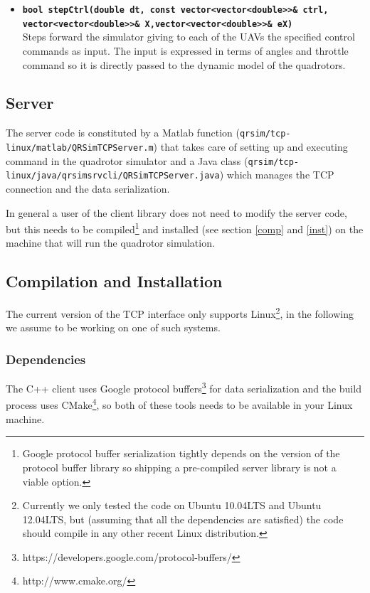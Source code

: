 \documentclass[a4paper,11pt]{report}
\begin{document}
\begin{itemize}
\item \textbf{\texttt{bool stepCtrl(double dt, const vector<vector<double>>\& ctrl,\\ \hspace*{80pt} vector<vector<double>>\& X,vector<vector<double>>\& eX)}}\\
Steps forward the simulator giving to each of the UAVs the specified control commands as input.
The input is expressed in terms of angles and throttle command so it is directly passed to the dynamic model of the quadrotors.

\end{itemize}

\subsection{Server}
The server code is constituted by a Matlab function (\texttt{qrsim/tcp-linux/matlab/QRSimTCPServer.m}) that takes care of setting up and executing command in the quadrotor simulator and a Java class (\texttt{qrsim/tcp-linux/java/qrsimsrvcli/QRSimTCPServer.java}) which manages the TCP connection and the data serialization.

In general a user of the client library does not need to modify the server code, but this needs to be compiled\footnote{Google protocol buffer serialization tightly depends on the version of the protocol buffer library so shipping a pre-compiled server library is not a viable option.} and installed (see section \ref{comp} and \ref{inst}) on the machine that will run the quadrotor simulation.

\subsection{Compilation and Installation}

The current version of the TCP interface only supports Linux\footnote{Currently we only tested the code on Ubuntu 10.04LTS and Ubuntu 12.04LTS, but (assuming that all the dependencies are satisfied) the code should compile in any other recent Linux distribution.}, in the following we assume to be working on one of such systems.

\subsubsection{Dependencies} 
The C++ client uses Google protocol buffers\footnote{https://developers.google.com/protocol-buffers/} for data serialization and the build process uses CMake\footnote{http://www.cmake.org/}, so both of these tools needs to be available in your Linux machine.
\end{document}
